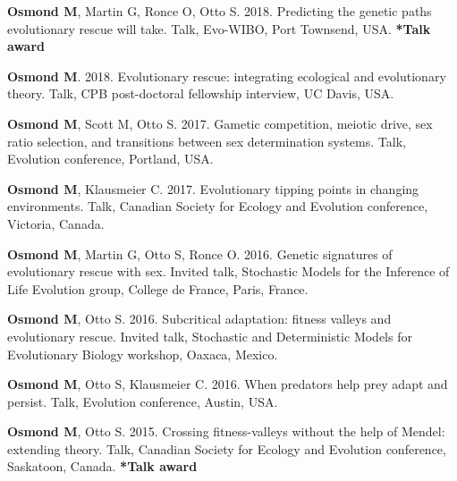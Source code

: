 \documentclass[12pt]{article}
\begin{document}
\textbf{Osmond M}, Martin G, Ronce O, Otto S. 2018. Predicting the genetic paths evolutionary rescue will take. Talk, Evo-WIBO, Port Townsend, USA. \textbf{*Talk award}


\textbf{Osmond M}. 2018. Evolutionary rescue: integrating ecological and evolutionary theory. Talk, CPB post-doctoral fellowship interview, UC Davis, USA. 

\textbf{Osmond M}, Scott M, Otto S. 2017. Gametic competition, meiotic drive, sex ratio selection, and transitions between sex determination systems. Talk, Evolution conference, Portland, USA. 

\textbf{Osmond M}, Klausmeier C. 2017. Evolutionary tipping points in changing environments. Talk, Canadian Society for Ecology and Evolution conference, Victoria, Canada. 

\textbf{Osmond M}, Martin G, Otto S, Ronce O. 2016. Genetic signatures of evolutionary rescue with sex. Invited talk, Stochastic Models for the Inference of Life Evolution group, College de France, Paris, France. 


\textbf{Osmond M}, Otto S. 2016. Subcritical adaptation: fitness valleys and evolutionary rescue. Invited talk, Stochastic and Deterministic Models for Evolutionary Biology workshop, Oaxaca, Mexico. 


\textbf{Osmond M}, Otto S, Klausmeier C. 2016. When predators help prey adapt and persist. Talk, Evolution conference, Austin, USA. 


\textbf{Osmond M}, Otto S. 2015. Crossing fitness-valleys without the help of Mendel: extending theory. Talk, Canadian Society for Ecology and Evolution conference, Saskatoon, Canada. \textbf{*Talk award}
\end{document}
